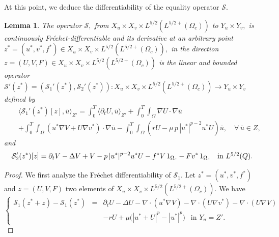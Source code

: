 \documentclass[11pt,reqno]{amsart}%
\newtheorem{lemma}[theorem]{Lemma}
\numberwithin{equation}{section}
\begin{document}
{At this point, we deduce the  differentiability of the equality operator $\mathcal{S}$.
\begin{lemma}\label{der-oper}
The operator $\mathcal{S},$ from ${X}_{u}  \times {X}_{v} \times L^{5/2}(L^{5/2+}(\Omega_c))$ to $Y_u \times Y_v,$ is continuously Fr\'echet-differentiable and its derivative at an arbitrary point 
$z^*=(u^*,v^*,f^*)\in {X}_{ u} \times {X}_{v} \times L^{5/2}(L^{5/2+}(\Omega_c)),$ in the direction $z=(U,V,F)\in {X}_{ u} 
\times{X}_{v}\times L^{5/2}(L^{5/2+}(\Omega_c)) $ is the linear and bounded operator $\mathcal{S}'(z^*)=(\mathcal{S}_1'(z^*),\mathcal{S}_2'(z^*)): {X}_{ u} 
\times{X}_{v}\times L^{5/2}(L^{5/2+}(\Omega_c)) \to Y_u \times Y_v$ defined by
\begin{eqnarray}\label{sss-2-u}
&&\langle\mathcal{S}_1'(z^*)[z],\overline{u}\rangle_{Z'}
=
\int_0^T\langle\partial_tU,\overline{u}\rangle_{Z'}
+\int_0^T\int_\Omega\nabla U\cdot\nabla\overline{u}
\nonumber\\
&&+\int_0^T\int_\Omega\left(u^*\nabla V+U\nabla v^*\right)\cdot\nabla\overline{u}
-\int_0^T\int_\Omega\left(rU - \mu \,p \, |u^*|^{p-2} u^* U\right)\overline{u},
\quad \forall\,\overline{u}\in Z,
\end{eqnarray}
and 
\begin{equation} \label{sss-2-v}
\mathcal{S}_2'(z^*)[z]=
\partial_tV-\Delta V+V-p \, |u^*|^{p-2} u^* U-f^*V\,1_{\Omega_c}-Fv^*\,1_{\Omega_c}
\quad \hbox{in $L^{5/2}(Q)$}.
\end{equation}
\end{lemma}
\begin{proof}
%
We first analyze the Fr\'echet differentiability of $\mathcal{S}_1$.  Let $z^*=(u^*,v^*,f^*)$ and $z=(U,V,F)$ two elements of
${X}_u\times {X}_v\times L^{5/2}(L^{5/2+}(\Omega_c))$. We have
\begin{equation}\label{sss-3}
\left\{
\begin{array}{rcl}
\mathcal{S}_1(z^*+z)-\mathcal{S}_1(z^*)
&=&\partial_tU-\Delta U-\nabla\cdot(u^*\nabla V)-\nabla\cdot(U\nabla v^*)-\nabla\cdot(U\nabla V)\\
&& -rU + \mu\Big( |u^*+U|^p - |u^*|^p \Big) \ \ \mbox{ in } Y_u=Z'.
\end{array}
\right.
\end{equation}


\end{proof}}
\end{document}
